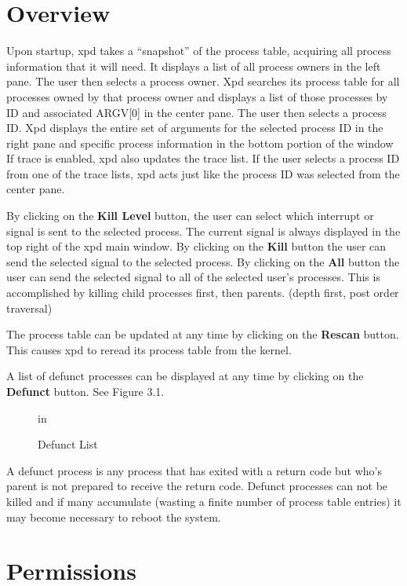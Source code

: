 \chapter{Overview}
Upon startup, xpd takes a ``snapshot'' of the process table, acquiring all process information that it will need.
It displays a list of all process owners in the left pane.
The user then selects a process owner.
Xpd searches its process table for all processes owned by that process owner and displays a list of those processes by ID and associated ARGV[0] in the center pane.
The user then selects a process ID.
Xpd displays the entire set of arguments for the selected process ID in the right pane and specific process information in the bottom portion of the window
If trace is enabled, xpd also updates the trace list.
If the user selects a process ID from one of the trace lists, xpd acts just like the process ID was selected from the center pane.

By clicking on the {\bf Kill Level} button, the user can select which interrupt or signal is sent to the selected process.
The current signal is always displayed in the top right of the xpd main window.
By clicking on the {\bf Kill} button the user can send the selected signal to the selected process.
By clicking on the {\bf All} button the user can send the selected signal to all of the selected user's processes.
This is accomplished by killing child processes first, then parents. (depth first, post order traversal)

The process table can be updated at any time by clicking on the {\bf Rescan} button.
This causes xpd to reread its process table from the kernel.

A list of defunct processes can be displayed at any time by clicking on the {\bf Defunct} button.
See Figure 3.1.
\begin{figure}[h]
    in
   \caption{Defunct List}
\end{figure}
A defunct process is any process that has exited with a return code but who's parent is not prepared to receive the return code.
Defunct processes can not be killed and if many accumulate (wasting a finite number of process table entries) it may become necessary to reboot the system.


\chapter{Permissions}


